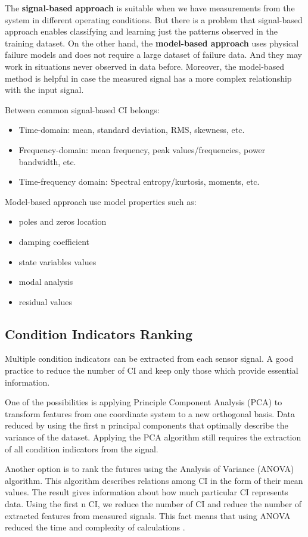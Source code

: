The \textbf{signal-based approach} is suitable when we have measurements
from the system in different operating conditions.  But there is a problem
that signal-based approach enables classifying and learning just the
patterns observed in the training dataset.  On the other hand, the
\textbf{model-based approach} uses physical failure models and does not
require a large dataset of failure data. And they may work in situations
never observed in data before. Moreover, the model-based method is helpful
in case the measured signal has a more complex relationship with the input
signal.

Between common signal-based CI belongs:
\begin{itemize}
    \item Time-domain: mean, standard deviation, RMS, skewness, etc. 
    \item Frequency-domain: mean frequency, peak values/frequencies, power
        bandwidth, etc. 
    \item Time-frequency domain: Spectral entropy/kurtosis, moments, etc. 
\end{itemize}

Model-based approach use model properties such as:
\begin{itemize}
    \item poles and zeros location
    \item damping coefficient
    \item state variables values
    \item modal analysis
    \item residual values
\end{itemize}

\subsection{Condition Indicators Ranking}\label{sec:ci_ranking}
Multiple condition indicators can be extracted from each sensor signal.  A
good practice to reduce the number of CI and keep only those which provide
essential information. 

One of the possibilities is applying Principle Component Analysis (PCA) to
transform features from one coordinate system to a new orthogonal basis.
Data reduced by using the first n principal components that optimally
describe the variance of the dataset. Applying the PCA algorithm still
requires the extraction of all condition indicators from the signal.

Another option is to rank the futures using the Analysis of Variance
(ANOVA) algorithm. This algorithm describes relations among CI in the form
of their mean values. The result gives information about how much
particular CI represents data. Using the first n CI, we reduce the number
of CI and reduce the number of extracted features from measured signals.
This fact means that using ANOVA reduced the time and complexity of
calculations \cite{matlab_full}.

